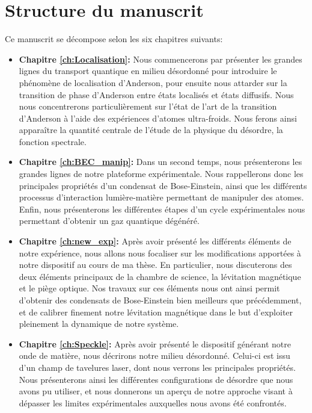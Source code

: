 \section{Structure du manuscrit}
Ce manuscrit se décompose selon les six chapitres suivants:
\begin{itemize}
\item[\textendash] \textbf{Chapitre \ref{ch:Localisation}:} Nous commencerons par présenter les grandes lignes du transport quantique en milieu désordonné pour introduire le phénomène de localisation d'Anderson, pour ensuite nous attarder sur la transition de phase d'Anderson entre états localisés et états diffusifs. Nous nous concentrerons particulièrement sur l'état de l'art de la transition d'Anderson à l'aide des expériences d'atomes ultra-froids.  Nous ferons ainsi apparaître la quantité centrale de l'étude de la physique du désordre, la fonction spectrale. \\

\item[\textendash] \textbf{Chapitre \ref{ch:BEC_manip}:} Dans un second temps, nous présenterons les grandes lignes de notre plateforme expérimentale. Nous rappellerons donc les principales propriétés d'un condensat de Bose-Einstein, ainsi que les différents processus d'interaction lumière-matière permettant de manipuler des atomes. Enfin, nous présenterons les différentes étapes d'un cycle expérimentales nous permettant d'obtenir un gaz quantique dégénéré. \\

\item[\textendash] \textbf{Chapitre \ref{ch:new_exp}:} Après avoir présenté les différents éléments de notre expérience, nous allons nous focaliser sur les modifications apportées à notre dispositif au cours de ma thèse. En particulier, nous discuterons des deux éléments principaux de la chambre de science, la lévitation magnétique et le piège optique. Nos travaux sur ces éléments nous ont ainsi permit d'obtenir des condensats de Bose-Einstein bien meilleurs que précédemment, et de calibrer finement notre lévitation magnétique dans le but d'exploiter pleinement la dynamique de notre système. \\

\item[\textendash] \textbf{Chapitre \ref{ch:Speckle}:} Après avoir présenté le dispositif générant notre onde de matière, nous décrirons notre milieu désordonné. Celui-ci est issu d'un champ de tavelures laser, dont nous verrons les principales propriétés. Nous présenterons ainsi les différentes configurations de désordre que nous avons pu utiliser, et nous donnerons un aperçu de notre approche visant à dépasser les limites expérimentales auxquelles nous avons été confrontés. \\


\end{itemize}
